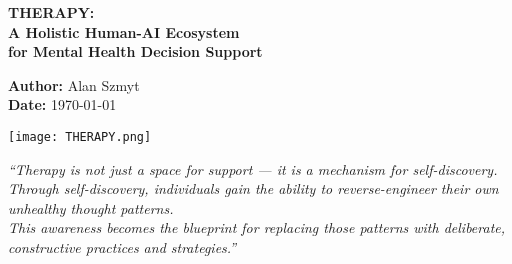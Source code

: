 \begin{titlepage}
\centering

\vspace*{2cm}

{\LARGE\bfseries THERAPY:\\[0.5em]
A Holistic Human-AI Ecosystem\\[0.5em]
for Mental Health Decision Support}

\vspace{2.5cm}

\textbf{Author:} Alan Szmyt \\
\textbf{Date:} \today

\vspace{2cm}

\texttt{[image: THERAPY.png]}

\vspace{2cm}

\textit{
“Therapy is not just a space for support — it is a mechanism for self-discovery. \\
Through self-discovery, individuals gain the ability to reverse-engineer their own unhealthy thought patterns. \\
This awareness becomes the blueprint for replacing those patterns with deliberate, constructive practices and strategies.”
}

\vfill

\end{titlepage}

